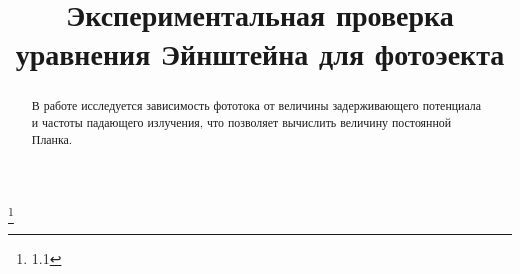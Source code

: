 


\title{Экспериментальная проверка уравнения Эйнштейна для фотоэекта}
\thanks{1.1}



\begin{abstract}
В работе исследуется зависимость фототока от величины задерживающего потенциала и частоты падающего излучения, что позволяет вычислить величину постоянной Планка.

\end{abstract}


\maketitle

